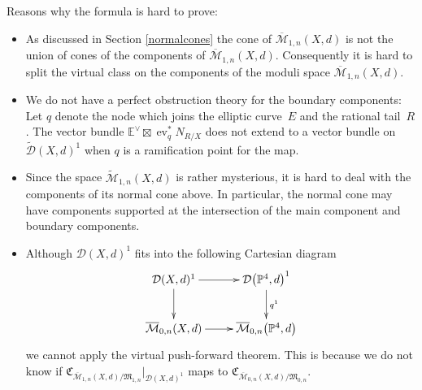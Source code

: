 \documentclass[pdftex]{sigma}
\numberwithin{equation}{section}
\newcommand{\MM}[4]{\overline{\mathcal M}_{#1,#2}(#3,#4)}
\theoremstyle{plain}
\theoremstyle{definition}
\theoremstyle{remark}
\begin{document}
Reasons why the formula is hard to prove:
\begin{itemize}\itemsep=0pt
 \item As discussed in Section \ref{normalcones} the cone of $\MM{1}{n}{X}{d}$ is not the union of cones of the components of $\MM{1}{n}{X}{d}$. Consequently it is hard to split the virtual class on the components of the moduli space $\MM{1}{n}{X}{d}$.
 \item We do not have a perfect obstruction theory for the boundary components: Let $q$ denote the node which joins the elliptic curve~$E$ and the rational tail~$R$. The vector bundle $\mathbb E^\vee\boxtimes\operatorname{ev}_q^* N_{R/X}$ does not extend to a vector bundle on $\widetilde{\mathcal D}(X,d)^1$ when $q$ is a ramification point for the map.

\item Since the space $\widetilde{\mathcal M}_{1,n}(X,d)$ is rather mysterious, it is hard to deal with the components of its normal cone above. In particular, the normal cone may have components supported at the intersection of the main component and boundary components.

\item Although $\mathcal D(X,d)^1$ fits into the following Cartesian diagram
\begin{equation*}
 \begin{xymatrix}
 {
 \mathcal D(X,d)^1 \ar[r]\ar[d]& \mathcal D\big(\mathbb P^4,d\big)^1\ar[d]^{q^1}\\
 \MM{0}{n}{X}{d} \ar[r] & \overline{\mathcal{M}}_{0,n}\big({\mathbb P}^4,d\big)
 }
 \end{xymatrix}
\end{equation*}
we cannot apply the virtual push-forward theorem. This is because we do not know if $\mathfrak C_{\MM{1}{n}{X}{d}/\mathfrak{M}_{1,n}}|_{\mathcal {D}(X,d)^1}$ maps to $\mathfrak C_{\MM{0}{n}{X}{d}/\mathfrak{M}_{0,n}}$.
\end{itemize}
\end{document}
